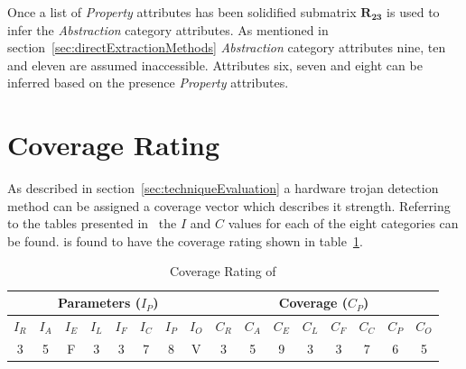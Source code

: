 Once a list of \textit{Property} attributes has been solidified submatrix $\mathbf{R_{23}}$ is used to infer the \textit{Abstraction} category attributes. 
As mentioned in section~\ref{sec:directExtractionMethods} \textit{Abstraction} category attributes nine, ten and eleven are assumed inaccessible.
Attributes six, seven and eight can be inferred based on the presence \textit{Property} attributes. 

\section{Coverage Rating} \label{sec:automationCoverage}
As described in section~\ref{sec:techniqueEvaluation} a hardware trojan detection method can be assigned a coverage vector which describes it strength.
Referring to the tables presented in~\cite{samerDissertation} the $I$ and $C$ values for each of the eight categories can be found.
\NameNoPeriod is found to have the coverage rating shown in table~\ref{tbl:nameCoverageRating}.
\begin{table}[h]
	\centering
	\caption{Coverage Rating of \Name}
	\label{tbl:nameCoverageRating}
	\begin{tabular}{|c|c|c|c|c|c|c|c|c|c|c|c|c|c|c|c|}
		\hline
		\multicolumn{8}{|c|}{Parameters ($I_P$)} & \multicolumn{8}{c|}{Coverage ($C_P$)} \\ \hline
		$I_R$ & $I_A$ & $I_E$ & $I_L$ & $I_F$ & $I_C$ & $I_P$ & $I_O$ & $C_R$ & $C_A$ & $C_E$ & $C_L$ & $C_F$ & $C_C$ & $C_P$ & $C_O$ \\ \hline
		3 & 5 & F & 3 & 3 & 7 & 8 & V & 3 & 5 & 9 & 3 & 3 & 7 & 6 & 5 \\ \hline
	\end{tabular}
\end{table}